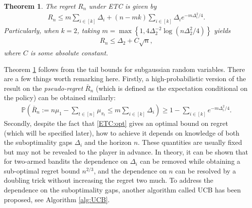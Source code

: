 \documentclass[10pt,a4article]{amsart}
\numberwithin{equation}{section}
\theoremstyle{plain}
\newtheorem{Th}{Theorem}
\theoremstyle{definition}
\def\P{{\mathbb P}}
\begin{document}
\begin{Th}\label{thm:ETC}
The regret $R_n$ under ETC is given by
\begin{align}
R_n\leq m\sum_{i\in [k]}\Delta_i + (n-mk)\sum_{i\in [k]}\Delta_i e^{-m\Delta_i^2/4}.
\end{align}
Particularly, when $k=2$, taking $m=\max\left\{1, 4\Delta_2^{-2}\log(n\Delta_2^2/4)\right\}$ yields
\begin{align}
R_n\leq\Delta_2+C\sqrt{n},\label{ETC:opt}
\end{align}
where $C$ is some absolute constant. 
\end{Th}

Theorem \ref{thm:ETC} follows from the tail bounds for subgaussian random variables. There are a few things worth remarking here. Firstly, a high-probabilistic version of the result on the \emph{pseudo-regret} $\bar{R}_n$ (which is defined as the expectation conditional on the policy) can be obtained similarly:
\begin{align*}
\P\left(\bar{R}_n:=n\mu_1-\sum_{t\in [n]}\mu_{\pi_t}\leq m\sum_{i\in [k]}\Delta_i\right)\geq 1-\sum_{i\in [k]}e^{-m\Delta_i^2/4}. 
\end{align*} 
Secondly, despite the fact that \eqref{ETC:opt} gives an optimal bound on regret (which will be specified later), how to achieve it depends on knowledge of both the suboptimality gaps $\Delta_i$ and the horizon $n$. These quantities are usually fixed but may not be revealed to the player in advance. In theory, it can be shown that for two-armed bandits the dependence on $\Delta_i$ can be removed while obtaining a sub-optimal regret bound $n^{2/3}$, and the dependence on $n$ can be resolved by a doubling trick without increasing the regret two much. To address the dependence on the suboptimality gaps, another algorithm called UCB has been proposed, see Algorithm \ref{alg:UCB}. 
\end{document}
